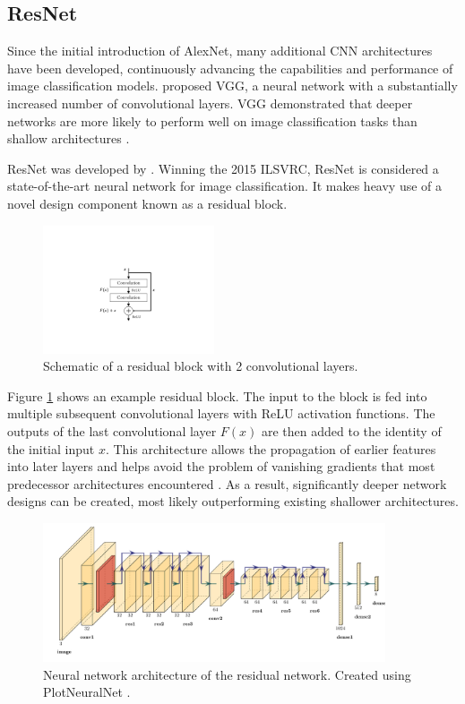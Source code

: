 \documentclass{l4proj}
\begin{document}
\subsection{ResNet}
\label{resnet}

Since the initial introduction of AlexNet, many additional CNN architectures have been developed, continuously advancing the capabilities and performance of image classification models. \citet{simonyan_very_2015} proposed VGG, a neural network with a substantially increased number of convolutional layers. VGG demonstrated that deeper networks are more likely to perform well on image classification tasks than shallow architectures \citep{alom_history_2018}.

ResNet was developed by \citet{he_deep_2016}. Winning the 2015 ILSVRC, ResNet is considered a state-of-the-art neural network for image classification. It makes heavy use of a novel design component known as a residual block. 

\begin{figure}[ht]
  \centering
  \includegraphics[width=0.45\textwidth, trim={7cm 4.8cm 7cm 6cm}, clip]{images/models/res_block}
  \caption{Schematic of a residual block with 2 convolutional layers.}
  \label{fig:res_block}
\end{figure}

Figure \ref{fig:res_block} shows an example residual block. The input to the block is fed into multiple subsequent convolutional layers with ReLU activation functions. The outputs of the last convolutional layer $F(x)$ are then added to the identity of the initial input $x$. This architecture allows the propagation of earlier features into later layers and helps avoid the problem of vanishing gradients that most predecessor architectures encountered \citep{alom_history_2018}. As a result, significantly deeper network designs can be created, most likely outperforming existing shallower architectures.

\begin{figure}[ht]
  \centering
  \includegraphics[width=0.9\textwidth]{images/models/resnet}
  \caption{Neural network architecture of the residual network. Created using PlotNeuralNet \citep{iqbal_harisiqbal88plotneuralnet_2018}.}
  \label{fig:resnet}
\end{figure}
\end{document}
